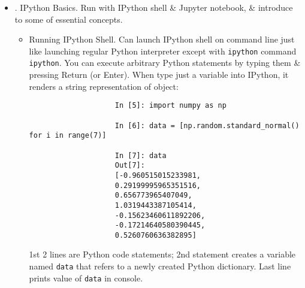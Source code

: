 \documentclass{article}
\begin{document}
\begin{enumerate}
\begin{itemize}
\begin{itemize}
			Running Python programs is as simple as calling {\tt python} with a {\tt.py} file as its 1st argument.
			
			While some Python programmers execute all of their Python code in this way, those doing data analysis or scientific computing make use of IPython, an enhanced Python interpreter, or Jupyter notebooks, web-based code notebooks originally created within IPython project. Give an introduction to using IPython \& Jupyter in this chap \& have included a deeper look at IPython functionality in Appendix A. When use \verb|%run| command, IPython executes code in specified file in same process, enabling to explore results interactively when it's done:
			\begin{verbatim}
				(pydata-book) nqbh@nqbh-dell:~$ ipython                            
				Python 3.12.7 | packaged by conda-forge | (main, Oct  4 2024, 16:05:46) [GCC 13.3.0]                                                                                Type 'copyright', 'credits' or 'license' for more information      
				IPython 8.31.0 -- An enhanced Interactive Python. Type '?' for help.                                                                                                In [1]: %run hello_world.py
				Hello world
				
				In [2]:
			\end{verbatim}
			Default IPython prompt adopts numbered {\tt In [2]:} style, cf. standard {\tt>>>} prompt.
			\item {. IPython Basics.} Run with IPython shell \& Jupyter notebook, \& introduce to some of essential concepts.
			\begin{itemize}
				\item {\sf Running IPython Shell.} Can launch IPython shell on command line just like launching regular Python interpreter except with {\tt ipython} command {\tt ipython}. You can execute arbitrary Python statements by typing them \& pressing Return (or Enter). When type just a variable into IPython, it renders a string representation of object:
				\begin{verbatim}
					In [5]: import numpy as np
					
					In [6]: data = [np.random.standard_normal() for i in range(7)]
					
					In [7]: data
					Out[7]: 
					[-0.960515015233981,
					0.29199995965351516,
					0.656773965407049,
					1.0319443387105414,
					-0.15623460611892206,
					-0.17214640580390445,
					0.5260760636382895]
				\end{verbatim}
				1st 2 lines are Python code statements; 2nd statement creates a variable named {\tt data} that refers to a newly created Python dictionary. Last line prints value of {\tt data} in console.
				

\end{itemize}
\end{itemize}
\end{itemize}
\end{enumerate}
\end{document}
